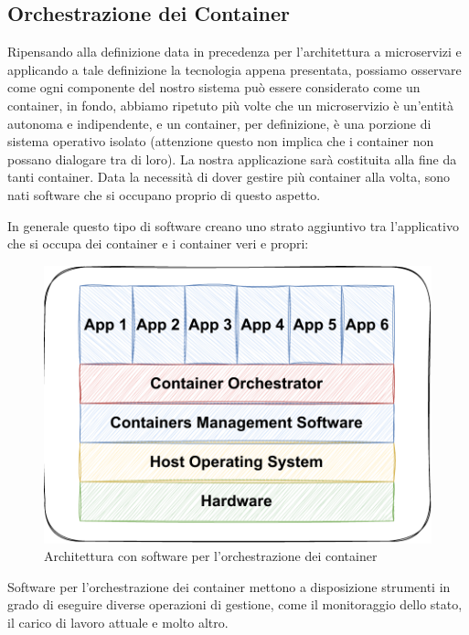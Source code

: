 \subsection{Orchestrazione dei Container}
Ripensando alla definizione data in precedenza per l'architettura a microservizi e applicando a tale definizione la tecnologia appena presentata, possiamo osservare come ogni componente del nostro sistema può essere considerato come un container, in fondo, abbiamo ripetuto più volte che un microservizio è un'entità autonoma e indipendente, e un container, per definizione, è una porzione di sistema operativo isolato (attenzione questo non implica che i container non possano dialogare tra di loro). La nostra applicazione sarà costituita alla fine da tanti container. Data la necessità di dover gestire più container alla volta, sono \cite{burns2022orchestrazione} nati software che si occupano proprio di questo aspetto. 

In generale questo tipo di software creano uno strato aggiuntivo tra l'applicativo che si occupa dei container e i container veri e propri:

\begin{figure}[h]
    \centering
    \includegraphics[scale=0.65]{capitoli/immagini/07_container_architecture_orchestrator.pdf}
    \caption{Architettura con software per l'orchestrazione dei container}
    \label{fig:orchestrator}
\end{figure}


Software per l'orchestrazione dei container \cite{cabibbo2022orchestrazione} mettono a disposizione strumenti in grado di eseguire diverse operazioni di gestione, come il monitoraggio dello stato, il carico di lavoro attuale e molto altro.


